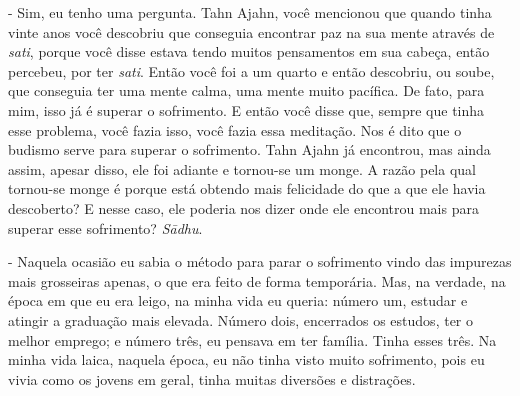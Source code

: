 - Sim, eu tenho uma pergunta. Tahn Ajahn, você mencionou que
quando tinha vinte anos você descobriu que conseguia encontrar paz na
sua mente através de \textit{sati}, porque você disse estava tendo
muitos pensamentos em sua cabeça, então percebeu, por ter
\textit{sati}. Então você foi a um quarto e então descobriu, ou soube,
que conseguia ter uma mente calma, uma mente muito pacífica. De fato,
para mim, isso já é superar o sofrimento. E então você disse que,
sempre que tinha esse problema, você fazia isso, você fazia essa
meditação. Nos é dito que o budismo serve para superar o sofrimento.
Tahn Ajahn já encontrou, mas ainda assim, apesar disso, ele
foi adiante e tornou-se um monge. A razão pela qual tornou-se monge é
porque está obtendo mais felicidade do que a que ele havia descoberto?
E nesse caso, ele poderia nos dizer onde ele encontrou mais para
superar esse sofrimento? \textit{S\=adhu}.

- Naquela ocasião eu sabia o método para parar o sofrimento vindo
das impurezas mais grosseiras apenas, o que era feito de forma
temporária. Mas, na verdade, na época em que eu era leigo, na minha
vida eu queria: número um, estudar e atingir a graduação mais elevada.
Número dois, encerrados os estudos, ter o melhor emprego; e número
três, eu pensava em ter família. Tinha esses três. Na minha vida laica,
naquela época, eu não tinha visto muito sofrimento, pois eu vivia como
os jovens em geral, tinha muitas diversões e distrações.

